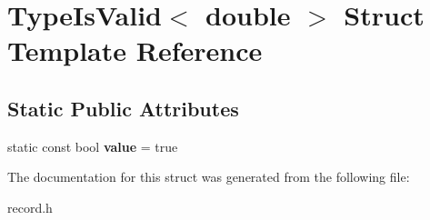 \hypertarget{struct_type_is_valid_3_01double_01_4}{\section{Type\-Is\-Valid$<$ double $>$ Struct Template Reference}
\label{struct_type_is_valid_3_01double_01_4}
}
\subsection*{Static Public Attributes}
\begin{DoxyCompactItemize}
\item 
\hypertarget{struct_type_is_valid_3_01double_01_4_a50347ed03137ab28704f0331b1d6602c}{static const bool {\bfseries value} = true}\label{struct_type_is_valid_3_01double_01_4_a50347ed03137ab28704f0331b1d6602c}

\end{DoxyCompactItemize}


The documentation for this struct was generated from the following file\-:\begin{DoxyCompactItemize}
\item 
record.\-h\end{DoxyCompactItemize}
